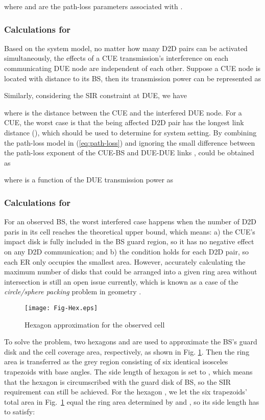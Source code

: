 \documentclass[journal, 10pt]{IEEEtran}
\begin{document}
where  and  are the path-loss parameters associated with 
. 


\subsubsection{Calculations for }
Based on the system model, no matter how many D2D pairs can be
activated simultaneously, the effects of a CUE transmission's
interference on each communicating DUE node are independent of each
other. Suppose a CUE node is located with distance 
to its BS, then its transmission power  can be
represented as 

Similarly, considering the SIR constraint at DUE, we have

where  is the distance between the CUE and the
interfered DUE node. For a CUE, the worst case is that the being
affected D2D pair has the longest link distance (), which should be used to determine  for
system setting. By combining the path-loss model in
(\ref{eq:path-loss}) and ignoring the small difference between the
path-loss exponent of the CUE-BS and DUE-DUE links \cite{Min:11TWC-b},
 could be obtained as 

where  is a function of the DUE transmission power  as 



\subsubsection{Calculations for }
For an observed BS, the worst interfered case happens when the number
of D2D paris in its cell reaches the theoretical upper bound, which
means: a) the CUE's impact disk is fully included in the BS guard
region, so it has no negative effect on any D2D communication; and b)
the condition  holds for each D2D pair, so
each ER only occupies the smallest area. 
However, accurately calculating the maximum number of disks that
could be arranged into a given ring area without intersection is still
an open issue currently, which is known as a case of the 
\emph{circle/sphere
packing} problem in geometry \cite{Stephenson:03circlepacking}. 
\begin{figure}[!h]
\centering
\texttt{[image: Fig-Hex.eps]} \caption{Hexagon approximation for the observed cell} \label{fig:hex-appox}
\end{figure}

To solve the problem, two hexagons  and  are used to
approximate the BS's guard disk and the cell coverage area,
respectively, as shown in Fig. \ref{fig:hex-appox}. Then the ring area
is transferred as the grey region consisting of six identical
isosceles trapezoids with  base angles. The side length of
hexagon  is set to , which means that the hexagon is circumscribed
with the guard disk of BS, so the SIR requirement 
can still be achieved. For the hexagon , we let the six
trapezoids' total area in Fig.~\ref{fig:hex-appox} equal the ring area
determined by  and , so its side length
 has to satisfy: 
\end{document}
